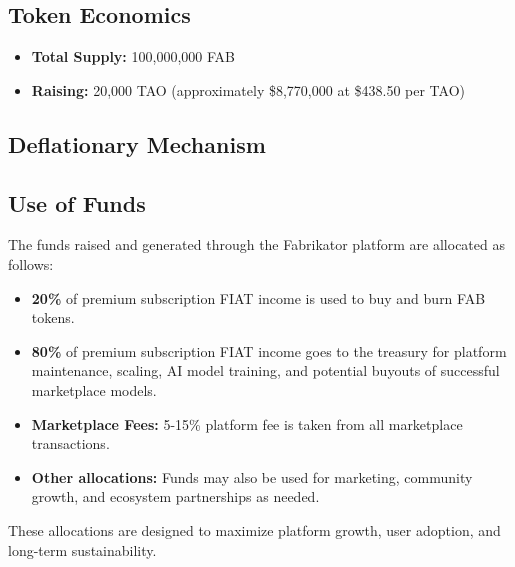 \subsection*{Token Economics}
\begin{itemize}[leftmargin=*]
    \item \textbf{\textcolor{fabPrimary}{Total Supply:}} 100,000,000 FAB
    \item \textbf{\textcolor{fabSecondary}{Raising:}} 20,000 TAO (approximately \$8,770,000 at \$438.50 per TAO)
\end{itemize}

\subsection*{Deflationary Mechanism}


\subsection*{Use of Funds}
The funds raised and generated through the Fabrikator platform are allocated as follows:
\begin{itemize}[leftmargin=*]
    \item \textbf{\textcolor{fabPrimary}{20\%}} of premium subscription FIAT income is used to buy and burn FAB tokens.
    \item \textbf{\textcolor{fabSecondary}{80\%}} of premium subscription FIAT income goes to the treasury for platform maintenance, scaling, AI model training, and potential buyouts of successful marketplace models.
    \item \textbf{\textcolor{fabAccent}{Marketplace Fees:}} 5-15\% platform fee is taken from all marketplace transactions.
    \item \textbf{\textcolor{fabGrey}{Other allocations:}} Funds may also be used for marketing, community growth, and ecosystem partnerships as needed.
\end{itemize}

These allocations are designed to maximize platform growth, user adoption, and long-term sustainability.

